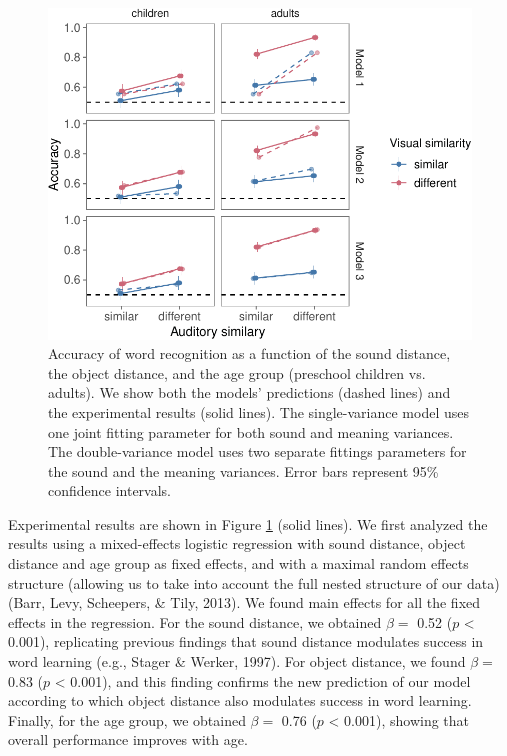 \documentclass[english,,man,floatsintext]{apa6}
\theoremstyle{definition}
\theoremstyle{definition}
\theoremstyle{definition}
\theoremstyle{remark}
\begin{document}
\begin{figure}[h]

{\centering \includegraphics{ms_files/figure-latex/allData-1} 

}

\caption{Accuracy of word recognition as a function of the sound distance, the object distance, and the age group (preschool children vs. adults). We show both the models' predictions (dashed lines) and the experimental results (solid lines). The single-variance model uses one joint fitting parameter for both sound and meaning variances. The double-variance model uses two separate fittings parameters for the sound and the meaning variances. Error bars represent 95\% confidence intervals.}\label{fig:allData}
\end{figure}

Experimental results are shown in Figure \ref{fig:allData} (solid
lines). We first analyzed the results using a mixed-effects logistic
regression with sound distance, object distance and age group as fixed
effects, and with a maximal random effects structure (allowing us to
take into account the full nested structure of our data) (Barr, Levy,
Scheepers, \& Tily, 2013). We found main effects for all the fixed
effects in the regression. For the sound distance, we obtained
\(\beta =\) 0.52 (\(p\) \textless{} 0.001), replicating previous
findings that sound distance modulates success in word learning (e.g.,
Stager \& Werker, 1997). For object distance, we found \(\beta =\) 0.83
(\(p\) \textless{} 0.001), and this finding confirms the new prediction
of our model according to which object distance also modulates success
in word learning. Finally, for the age group, we obtained \(\beta =\)
0.76 (\(p\) \textless{} 0.001), showing that overall performance
improves with age.
\end{document}
